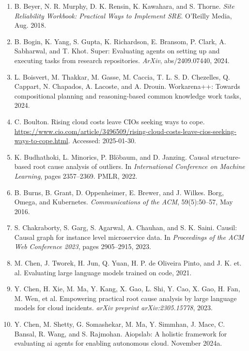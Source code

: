 \begin{enumerate}[leftmargin=2em,itemsep=2pt]
\item B. Beyer, N. R. Murphy, D. K. Rensin, K. Kawahara, and S. Thorne. \textit{Site Reliability Workbook: Practical Ways to Implement SRE}. O'Reilly Media, Aug. 2018.

\item B. Bogin, K. Yang, S. Gupta, K. Richardson, E. Bransom, P. Clark, A. Sabharwal, and T. Khot. Super: Evaluating agents on setting up and executing tasks from research repositories. \textit{ArXiv}, abs/2409.07440, 2024.

\item L. Boisvert, M. Thakkar, M. Gasse, M. Caccia, T. L. S. D. Chezelles, Q. Cappart, N. Chapados, A. Lacoste, and A. Drouin. Workarena++: Towards compositional planning and reasoning-based common knowledge work tasks, 2024.

\item C. Boulton. Rising cloud costs leave CIOs seeking ways to cope. \url{https://www.cio.com/article/3496509/rising-cloud-costs-leave-cios-seeking-ways-to-cope.html}. Accessed: 2025-01-30.

\item K. Budhathoki, L. Minorics, P. Bl\"obaum, and D. Janzing. Causal structure-based root cause analysis of outliers. In \textit{International Conference on Machine Learning}, pages 2357--2369. PMLR, 2022.

\item B. Burns, B. Grant, D. Oppenheimer, E. Brewer, and J. Wilkes. Borg, Omega, and Kubernetes. \textit{Communications of the ACM}, 59(5):50--57, May 2016.

\item S. Chakraborty, S. Garg, S. Agarwal, A. Chauhan, and S. K. Saini. Causil: Causal graph for instance level microservice data. In \textit{Proceedings of the ACM Web Conference 2023}, pages 2905--2915, 2023.

\item M. Chen, J. Tworek, H. Jun, Q. Yuan, H. P. de Oliveira Pinto, and J. K. et. al. Evaluating large language models trained on code, 2021.

\item Y. Chen, H. Xie, M. Ma, Y. Kang, X. Gao, L. Shi, Y. Cao, X. Gao, H. Fan, M. Wen, et al. Empowering practical root cause analysis by large language models for cloud incidents. \textit{arXiv preprint arXiv:2305.15778}, 2023.

\item Y. Chen, M. Shetty, G. Somashekar, M. Ma, Y. Simmhan, J. Mace, C. Bansal, R. Wang, and S. Rajmohan. Aiopslab: A holistic framework for evaluating ai agents for enabling autonomous cloud. November 2024a.


\end{enumerate}
